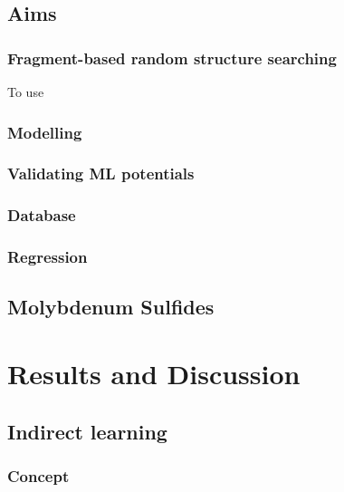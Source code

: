 \documentclass[12pt,a4paper,twoside,nobind]{ociamthesis}
\begin{document}



\section{Aims}

\subsection*{Fragment-based random structure searching}

To use 

\subsection*{Modelling }

\subsection*{Validating ML potentials}


\subsection{Database}

\subsection{Regression}
%
\section{Molybdenum Sulfides}
%
\chapter{Results and Discussion} \label{chap:theory}
%
\section{Indirect learning}

\subsection{Concept}
\end{document}
